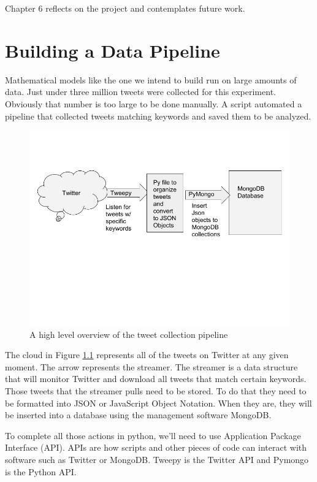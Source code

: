 \documentclass[11pt, twoside, reqno]{book}
\begin{document}
Chapter 6 reflects on the project and contemplates future work.  




\chapter{Building a Data Pipeline}
\label{Ch:2}
\hspace{0.2in} Mathematical models like the one we intend to build run on large amounts of data. Just under three million tweets were collected for this experiment. Obviously that number is too large to be done manually. A script automated a pipeline that collected tweets matching keywords and saved them to be analyzed. 

\begin{figure}[H]
	\centering
	\includegraphics[scale=0.45]{data_collection}
	\caption{A high level overview of the tweet collection pipeline}
	\label{fig:datacollection}
\end{figure}

The cloud in Figure \ref{fig:datacollection} represents all of the tweets on Twitter at any given moment. The arrow represents the streamer. The streamer is a data structure that will monitor Twitter and download all tweets that match certain keywords. Those tweets that the streamer pulls need to be stored. To do that they need to be formatted into JSON or JavaScript Object Notation. When they are, they will be inserted into a database using the management software MongoDB. 

To complete all those actions in python, we'll need to use Application Package Interface (API). APIs are how scripts and other pieces of code can interact with software such as Twitter or MongoDB. Tweepy is the Twitter API and Pymongo is the Python API. 
 
\end{document}
